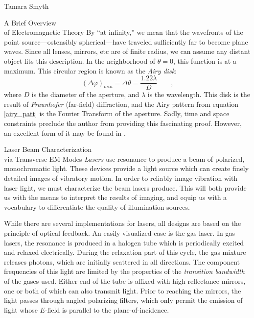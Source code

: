 \documentclass[a4paper,10pt]{report}
\numberwithin{equation}{section}
\begin{document}
\begin{chapter}{Tamara Smyth}
\begin{section}{A Brief Overview \\of Electromagnetic Theory}
By ``at infinity,'' we mean that the wavefronts of the point source---ostensibly spherical---have traveled sufficiently far to become plane waves. Since all lenses, mirrors, etc are of finite radius, we can assume any distant object fits this description. In the neighborhood of $\theta = 0$, this function is at a maximum. This circular region is known as the \emph{Airy disk}: \cite[p.~445]{Hecht1987} 
\begin{equation}
(\Delta \varphi)_{min} = \Delta \theta = \frac{1.22 \lambda}{D} \qquad \text{,}
\end{equation}
where $D$ is the diameter of the aperture, and $\lambda$ is the wavelength. This disk is the result of \emph{Fraunhofer} (far-field) diffraction, and the Airy pattern from equation \eqref{airy_patt} is the Fourier Transform of the aperture. \cite[p.~496]{Hecht1987} Sadly, time and space constraints preclude the author from providing this fascinating proof. However, an excellent form of it may be found in \cite[p.~104]{Goodman2005}. 
\end{section}
\begin{section}{Laser Beam Characterization\\ via Transverse EM Modes}\label{sec:lasers}
\emph{Lasers} use resonance to produce a beam of polarized, monochromatic light. These devices provide a light source which can create finely detailed images of vibratory motion. In order to reliably image vibration with laser light, we must characterize the beam lasers produce. This will both provide us with the means to interpret the results of imaging, and equip us with a vocabulary to differentiate the quality of illumination sources. 

While there are several implementations for lasers, all designs are based on the principle of optical feedback. An easily visualized case is the gas laser. In gas lasers, the resonance is produced in a halogen tube which is periodically excited and relaxed electrically. During the relaxation part of this cycle, the gas mixture releases photons, which are initially scattered in all directions. The component frequencies of this light are limited by the properties of the \emph{transition bandwidth} of the gases used. Either end of the tube is affixed with high reflectance mirrors, one or both of which can also transmit light. Prior to reaching the mirrors, the light passes through angled polarizing filters, which only permit the emission of light whose $E$-field is parallel to the plane-of-incidence. \cite[p.564]{Hecht1987}


\end{section}
\end{chapter}
\end{document}
